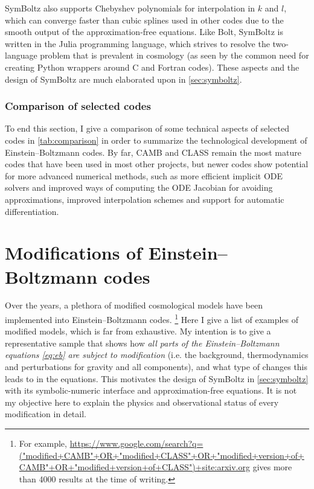 \documentclass[USenglish, thumbmarks]{uiophdthesis} %
\newcommand\EB{Einstein--Boltzmann}
\begin{document}
SymBoltz also supports Chebyshev polynomials for interpolation in $k$ and $l$,
which can converge faster than cubic splines used in other codes
due to the smooth output of the approximation-free equations.
Like Bolt, SymBoltz is written in the Julia programming language,
which strives to resolve the two-language problem that is prevalent in cosmology \cite{bezansonJuliaFreshApproach2017}
(as seen by the common need for creating Python wrappers around C and Fortran codes).
These aspects and the design of SymBoltz are much elaborated upon in \cref{sec:symboltz}.

\subsubsection{Comparison of selected codes}
To end this section,
I give a comparison of some technical aspects of selected codes in \cref{tab:comparison}
in order to summarize the technological development of \EB{} codes.
By far, CAMB and CLASS remain the most mature codes that have been used in most other projects,
but newer codes show potential for more advanced numerical methods,
such as more efficient implicit ODE solvers and improved ways of computing the ODE Jacobian for avoiding approximations,
improved interpolation schemes
and support for automatic differentiation.

\section{Modifications of \EB{} codes}
\label{sec:modifications}

Over the years, a plethora of modified cosmological models have been implemented into \EB{} codes.%
\footnote{For example, \url{https://www.google.com/search?q=("modified+CAMB"+OR+"modified+CLASS"+OR+"modified+version+of+CAMB"+OR+"modified+version+of+CLASS")+site:arxiv.org} gives more than 4000 results at the time of writing.}
Here I give a list of examples of modified models, which is far from exhaustive.
My intention is to give a representative sample that shows
how \emph{all parts of the \EB{} equations \eqref{eq:eb} are subject to modification}
(i.e. the background, thermodynamics and perturbations for gravity and all components),
and what type of changes this leads to in the equations.
This motivates the design of SymBoltz in \cref{sec:symboltz} with its symbolic-numeric interface and approximation-free equations.
It is not my objective here to explain the physics and observational status of every modification in detail.
\end{document}
